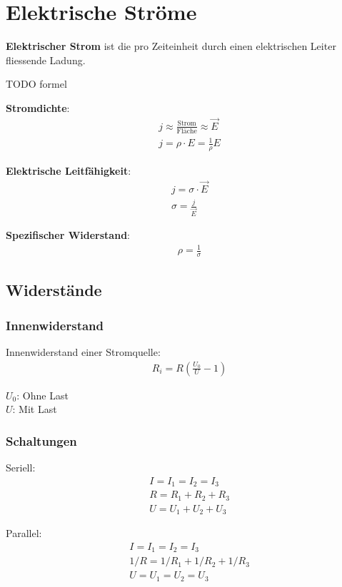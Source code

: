 \section{Elektrische Ströme}

\textbf{Elektrischer Strom} ist die pro Zeiteinheit durch einen elektrischen Leiter
fliessende Ladung.

TODO formel

\textbf{Stromdichte}:
\begin{align*}
	& j \approx \frac{\textrm{Strom}}{\textrm{Fläche}} \approx \vec{E} \\
	& j = \rho \cdot E = \frac{1}{\rho}E
\end{align*}

\textbf{Elektrische Leitfähigkeit}:
\begin{align*}
	& j = \sigma \cdot \vec{E} \\
	& \sigma = \frac{j}{\vec{E}}
\end{align*}

\textbf{Spezifischer Widerstand}:
\begin{align*}
	& \rho = \frac{1}{\sigma}
\end{align*}

\subsection{Widerstände}

\subsubsection{Innenwiderstand}

Innenwiderstand einer Stromquelle:
\begin{align*}
	& R_i = R \left(\frac{U_0}{U} - 1\right)
\end{align*}

$U_0$: Ohne Last\\
$U$: Mit Last

\subsubsection{Schaltungen}

\begin{minipage}[t]{.5\linewidth}
	Seriell:
	\begin{align*}
		& I = I_1 = I_2 = I_3 \\
		& R = R_1 + R_2 + R_3 \\
		& U = U_1 + U_2 + U_3
	\end{align*}
	
\end{minipage}
\begin{minipage}[t]{.5\linewidth}
	Parallel:
	\begin{align*}
		& I = I_1 = I_2 = I_3 \\
		& 1/R = 1/R_1 + 1/R_2 + 1/R_3 \\
		& U = U_1 = U_2 = U_3
	\end{align*}
	
\end{minipage}


